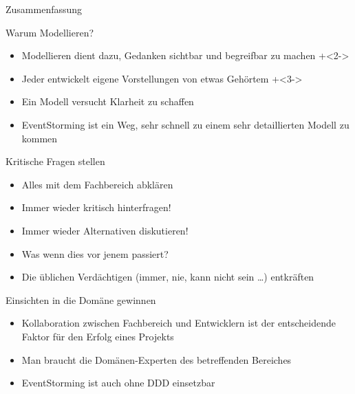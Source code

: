 \begin{frame}[fragile]{}

\begin{center}
{
\LARGE
Zusammenfassung
}
\end{center}

\end{frame}

\begin{frame}[fragile]{Warum Modellieren?}

\begin{itemize}
\item Modellieren dient dazu, Gedanken sichtbar und \glqq begreifbar\grqq{} zu machen
\onslide+<2->
\item Jeder entwickelt eigene Vorstellungen von etwas Gehörtem
\onslide+<3->
\item Ein Modell versucht Klarheit zu schaffen
\item EventStorming ist ein Weg, sehr schnell zu einem sehr detaillierten Modell zu kommen
\end{itemize}

\end{frame}

\begin{frame}[fragile]{Kritische Fragen stellen}

\begin{itemize}
\item Alles mit dem Fachbereich abklären
\item Immer wieder kritisch hinterfragen!
\item Immer wieder Alternativen diskutieren!
\item \glqq Was wenn dies vor jenem passiert?\grqq
\item Die üblichen Verdächtigen (\glqq immer\grqq, \glqq nie\grqq, \glqq kann nicht sein\grqq{} \ldots) entkräften
\end{itemize}

\end{frame}

\begin{frame}[fragile]{Einsichten in die Domäne gewinnen}
\begin{itemize}
\item Kollaboration zwischen Fachbereich und Entwicklern ist der entscheidende Faktor für den Erfolg eines Projekts
\item Man braucht die Domänen-Experten des betreffenden Bereiches
\item EventStorming ist auch ohne DDD einsetzbar
\end{itemize}

\end{frame}


